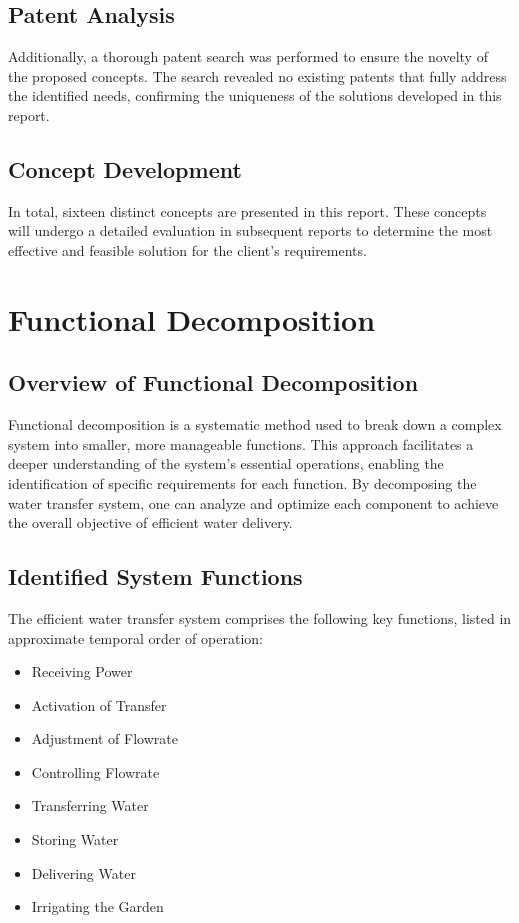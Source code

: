 \documentclass{article}
\begin{document}
\subsection{Patent Analysis}
Additionally, a thorough patent search was performed to ensure the novelty of the proposed concepts. The search revealed no existing patents that fully address the identified needs, confirming the uniqueness of the solutions developed in this report.

\subsection{Concept Development}
In total, sixteen distinct concepts are presented in this report. These concepts will undergo a detailed evaluation in subsequent reports to determine the most effective and feasible solution for the client's requirements.


\section{Functional Decomposition}

\subsection{Overview of Functional Decomposition}
Functional decomposition is a systematic method used to break down a complex system into smaller, more manageable functions. This approach facilitates a deeper understanding of the system's essential operations, enabling the identification of specific requirements for each function. By decomposing the water transfer system, one can analyze and optimize each component to achieve the overall objective of efficient water delivery.

\subsection{Identified System Functions}
The efficient water transfer system comprises the following key functions, listed in approximate temporal order of operation:

\begin{itemize}
    \item Receiving Power
    \item Activation of Transfer
    \item Adjustment of Flowrate
    \item Controlling Flowrate
    \item Transferring Water
    \item Storing Water
    \item Delivering Water
    \item Irrigating the Garden
\end{itemize}
\end{document}
